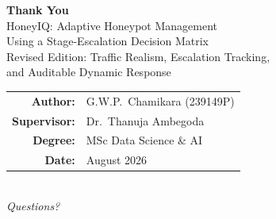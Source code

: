 \documentclass[aspectratio=169, 12pt]{beamer}
\begin{document}
\begin{frame}[plain]
  \begin{center}
    \vspace{1.5cm}
    {\Huge\textbf{Thank You}}\\[1cm]
    {\large HoneyIQ: Adaptive Honeypot Management\\
    Using a Stage-Escalation Decision Matrix\\
    \normalsize Revised Edition: Traffic Realism, Escalation Tracking,\\
    and Auditable Dynamic Response}\\[1cm]
    \begin{tabular}{rl}
      \textbf{Author:}     & G.W.P.\ Chamikara (239149P) \\
      \textbf{Supervisor:} & Dr.\ Thanuja Ambegoda \\
      \textbf{Degree:}     & MSc Data Science \& AI \\
      \textbf{Date:}       & August 2026 \\
    \end{tabular}\\[1cm]
    {\large\textit{Questions?}}
  \end{center}
\end{frame}
\end{document}
